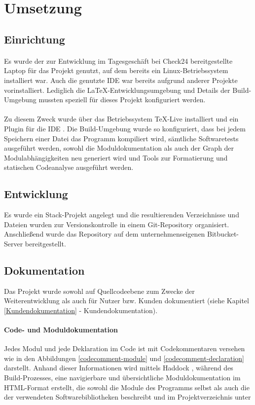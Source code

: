 \section{Umsetzung}

\subsection{Einrichtung}
\paragraph{}
Es wurde der zur Entwicklung im Tagesgeschäft bei Check24 bereitgestellte Laptop
für das Projekt genutzt, auf dem bereits ein Linux-Betriebssystem installiert war.
Auch die genutzte \gls{IDE} war bereits aufgrund anderer Projekte vorinstalliert.
Lediglich die \LaTeX-Entwicklungsumgebung und Details der Build-Umgebung mussten
speziell für dieses Projekt konfiguriert werden.

\paragraph{}
Zu diesem Zweck wurde über das Betriebssystem \TeX-Live \cite{texlive} installiert
und ein Plugin für die \gls{IDE} \cite{latex-workshop}. Die Build-Umgebung
wurde so konfiguriert, dass bei jedem Speichern einer Datei das Programm kompiliert wird,
sämtliche Softwaretests ausgeführt werden, sowohl die Moduldokumentation als auch
der Graph der Modulabhängigkeiten neu generiert wird und Tools zur Formatierung
und statischen Codeanalyse ausgeführt werden.

\subsection{Entwicklung}
Es wurde ein Stack\cite{stack}-Projekt angelegt und die resultierenden
Verzeichnisse und Dateien wurden zur Versionskontrolle in einem Git\cite{git}-Repository organisiert.
Anschließend wurde das Repository auf dem unternehmenseigenen Bitbucket-Server \cite{bitbucket}
bereitgestellt.

\subsection{Dokumentation}
Das Projekt wurde sowohl auf Quellcodeebene zum Zwecke der Weiterentwicklung als
auch für Nutzer bzw. Kunden dokumentiert (siehe Kapitel \ref{Kundendokumentation} - Kundendokumentation).

\paragraph{Code- und Moduldokumentation}
Jedes Modul und jede Deklaration im Code ist mit Codekommentaren versehen wie in
den Abbildungen \ref{codecomment-module} und \ref{codecomment-declaration} darstellt.
Anhand dieser Informationen wird mittels Haddock \cite{haddock}, während des Build-Prozesses,
eine navigierbare und übersichtliche Moduldokumentation im HTML-Format erstellt,
die sowohl die Module des Programms selbst als auch die der verwendeten Softwarebibliotheken
beschreibt und im Projektverzeichnis unter

